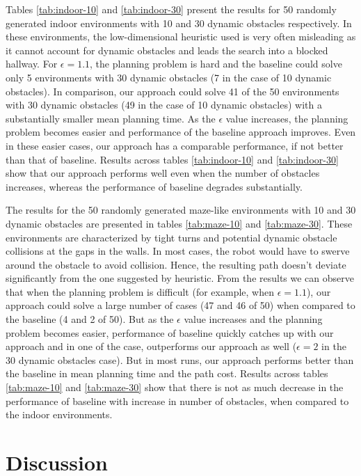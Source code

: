 Tables \ref{tab:indoor-10} and \ref{tab:indoor-30} present the results for 50 randomly generated indoor environments with 10 and 30 dynamic obstacles respectively. In these environments, the low-dimensional heuristic used is very often misleading as it cannot account for dynamic obstacles and leads the search into a blocked hallway. For $\epsilon=1.1$, the planning problem is hard and the baseline could solve only 5 environments with 30 dynamic obstacles (7 in the case of 10 dynamic obstacles). In comparison, our approach could solve 41 of the 50 environments with 30 dynamic obstacles (49 in the case of 10 dynamic obstacles) with a substantially smaller mean planning time. As the $\epsilon$ value increases, the planning problem becomes easier and performance of the baseline approach improves. Even in these easier cases, our approach has a comparable performance, if not better than that of baseline. Results across tables \ref{tab:indoor-10} and \ref{tab:indoor-30} show that our approach performs well even when the number of obstacles increases, whereas the performance of baseline degrades substantially.

The results for the 50 randomly generated maze-like environments with 10 and 30 dynamic obstacles are presented in tables \ref{tab:maze-10} and \ref{tab:maze-30}. These environments are characterized by tight turns and potential dynamic obstacle collisions at the gaps in the walls. In most cases, the robot would have to swerve around the obstacle to avoid collision. Hence, the resulting path doesn't deviate significantly from the one suggested by heuristic. From the results we can observe that when the planning problem is difficult (for example, when $\epsilon = 1.1$), our approach could solve a large number of cases (47 and 46 of 50) when compared to the baseline (4 and 2 of 50). But as the $\epsilon$ value increases and the planning problem becomes easier, performance of baseline quickly catches up with our approach and in one of the case, outperforms our approach as well ($\epsilon=2$ in the 30 dynamic obstacles case). But in most runs, our approach performs better than the baseline in mean planning time and the path cost. Results across tables \ref{tab:maze-10} and \ref{tab:maze-30} show that there is not as much decrease in the performance of baseline with increase in number of obstacles, when compared to the indoor environments.

\section{Discussion}
\label{sec:ppad-discussion}

